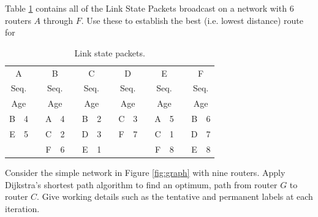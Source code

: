 
\question Table \ref{tab:link-state-packets} contains all of the Link State Packets broadcast on a network with $6$ routers $A$ through $F$.
Use these to establish the best (i.e. lowest distance) route for
\begin{table}
    \centering
    \caption{Link state packets.}
    \label{tab:link-state-packets}
    \begin{tabular}{cc c cc c cc c cc c cc c cc}
        \toprule
        \multicolumn{2}{c}{A} && \multicolumn{2}{c}{B} && \multicolumn{2}{c}{C} && \multicolumn{2}{c}{D} && \multicolumn{2}{c}{E} && \multicolumn{2}{c}{F} \\
        \cmidrule{1-2} \cmidrule{4-5} \cmidrule{7-8} \cmidrule{10-11} \cmidrule{13-14} \cmidrule{16-17}
        \multicolumn{2}{c}{Seq.} && \multicolumn{2}{c}{Seq.} && \multicolumn{2}{c}{Seq.} && \multicolumn{2}{c}{Seq.} && \multicolumn{2}{c}{Seq.} && \multicolumn{2}{c}{Seq.} \\ 
        \multicolumn{2}{c}{Age} && \multicolumn{2}{c}{Age} && \multicolumn{2}{c}{Age} && \multicolumn{2}{c}{Age} && \multicolumn{2}{c}{Age} && \multicolumn{2}{c}{Age} \\
        \cmidrule{1-2} \cmidrule{4-5} \cmidrule{7-8} \cmidrule{10-11} \cmidrule{13-14} \cmidrule{16-17}
        B & 4 && A & 4 && B & 2 && C & 3 && A & 5 && B & 6 \\
        E & 5 && C & 2 && D & 3 && F & 7 && C & 1 && D & 7 \\
        &&&      F & 6 && E & 1 && &&&      F & 8 && E & 8 \\
        \bottomrule
    \end{tabular}
\end{table}

\question Consider the simple network in Figure \ref{fig:graph} with nine routers.
Apply Dijkstra's shortest path algorithm to find an optimum, path from router $G$ to router $C$. 
Give working details such as the tentative and permanent labels at each iteration.

